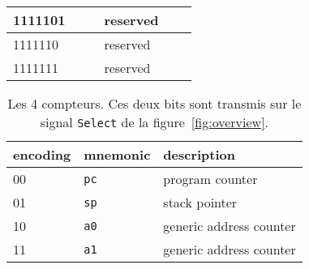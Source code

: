 \documentclass[architecture]{compas2018}
\begin{document}
\begin{table}[!h]
\begin{center}
\begin{tabular}{|l|l|l|l|l|c|}
    \hline
    1111101 & \texttt{}       &                               & reserved                                             &      &             \\
    \hline
    1111110 & \texttt{}       &                               & reserved                                             &      &             \\
    \hline
    1111111 & \texttt{}       &                               & reserved                                             &      &             \\
    \hline
  \end{tabular}
\end{center}
\end{table}




\begin{table} 
  \caption{Les 4 compteurs. Ces deux bits sont transmis sur le signal \texttt{Select} de la figure~\ref{fig:overview}. }
  \label{tab:counters}
\begin{center}
  \begin{tabular}{|l|l|l|}
    \hline  
  encoding  & mnemonic & description \\
    \hline  
    \hline  
    00& \texttt{pc} &  program counter\\
    \hline
    01& \texttt{sp} & stack pointer\\
    \hline
    10& \texttt{a0} &  generic address counter\\
    \hline
    11& \texttt{a1} &  generic address counter\\
    \hline
  \end{tabular}
\end{center}
\end{table}
\end{document}
